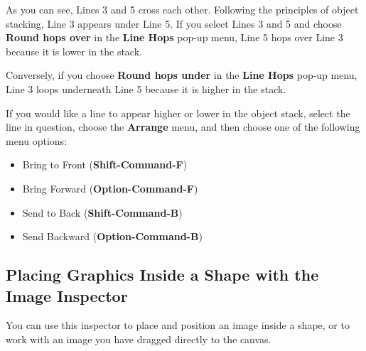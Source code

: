 \documentclass[../main.tex]{subfiles}
\begin{document}
\begin{itemize}
    As you can see, Lines 3 and 5 cross each other. Following the principles of object stacking,
    Line 3 appears under Line 5. If you select Lines 3 and 5 and choose \textbf{Round hops over}
    in the \textbf{Line Hops} pop-up menu, Line 5 hops over Line 3 because it is lower in the
    stack.


    Conversely, if you choose \textbf{Round hops under} in the \textbf{Line Hops} pop-up menu,
    Line 3 loops underneath Line 5 because it is higher in the stack.


    If you would like a line to appear higher or lower in the object stack, select the line in
    question, choose the \textbf{Arrange} menu, and then choose one of the following menu
    options:

    \begin{itemize}
      \item Bring to Front (\textbf{Shift-Command-F})
      \item Bring Forward (\textbf{Option-Command-F})
      \item Send to Back (\textbf{Shift-Command-B})
      \item Send Backward (\textbf{Option-Command-B})
    \end{itemize}
\end{itemize}

\subsection{Placing Graphics Inside a Shape with the Image Inspector}

You can use this inspector to place and position an image inside a shape, or to work with an
image you have dragged directly to the canvas.

\end{document}
